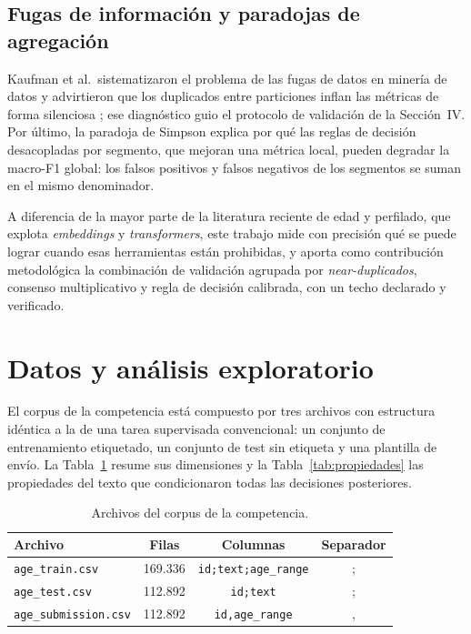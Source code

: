 \documentclass[journal]{IEEEtai}
\begin{document}
\subsection{Fugas de informaci\'on y paradojas de agregaci\'on}

Kaufman et al.\ sistematizaron el problema de las fugas de datos en miner\'ia de datos y advirtieron que los duplicados entre particiones inflan las m\'etricas de forma silenciosa \cite{kaufman2012}; ese diagn\'ostico guio el protocolo de validaci\'on de la Secci\'on~IV. Por \'ultimo, la paradoja de Simpson \cite{simpson1951} explica por qu\'e las reglas de decisi\'on desacopladas por segmento, que mejoran una m\'etrica local, pueden degradar la macro-F1 global: los falsos positivos y falsos negativos de los segmentos se suman en el mismo denominador.

A diferencia de la mayor parte de la literatura reciente de edad y perfilado, que explota \textit{embeddings} y \textit{transformers}, este trabajo mide con precisi\'on qu\'e se puede lograr cuando esas herramientas est\'an prohibidas, y aporta como contribuci\'on metodol\'ogica la combinaci\'on de validaci\'on agrupada por \textit{near-duplicados}, consenso multiplicativo y regla de decisi\'on calibrada, con un techo declarado y verificado.

\section{Datos y an\'alisis exploratorio}

El corpus de la competencia est\'a compuesto por tres archivos con estructura id\'entica a la de una tarea supervisada convencional: un conjunto de entrenamiento etiquetado, un conjunto de test sin etiqueta y una plantilla de env\'io. La Tabla~\ref{tab:datos} resume sus dimensiones y la Tabla~\ref{tab:propiedades} las propiedades del texto que condicionaron todas las decisiones posteriores.

\begin{table}[htbp]
\centering
\caption{Archivos del corpus de la competencia.}
\label{tab:datos}
\footnotesize
\setlength{\tabcolsep}{4pt}
\begin{tabular}{lccc}
\toprule
Archivo & Filas & Columnas & Separador \\
\midrule
\texttt{age\_train.csv} & 169.336 & \texttt{id;text;age\_range} & ; \\
\texttt{age\_test.csv} & 112.892 & \texttt{id;text} & ; \\
\texttt{age\_submission.csv} & 112.892 & \texttt{id,age\_range} & , \\
\bottomrule
\end{tabular}
\end{table}
\end{document}
